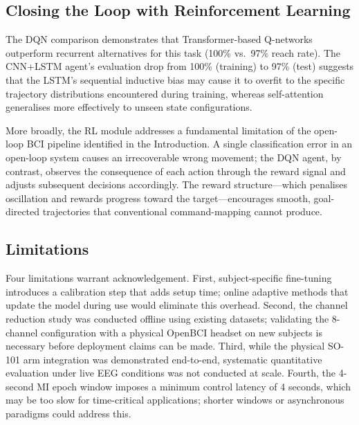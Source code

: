 \documentclass[12pt, a4paper]{article}
\begin{document}
\subsection{Closing the Loop with Reinforcement Learning}

The DQN comparison demonstrates that Transformer-based Q-networks outperform recurrent alternatives for this task (100\% vs.~97\% reach rate). The CNN+LSTM agent's evaluation drop from 100\% (training) to 97\% (test) suggests that the LSTM's sequential inductive bias may cause it to overfit to the specific trajectory distributions encountered during training, whereas self-attention generalises more effectively to unseen state configurations.

More broadly, the RL module addresses a fundamental limitation of the open-loop BCI pipeline identified in the Introduction. A single classification error in an open-loop system causes an irrecoverable wrong movement; the DQN agent, by contrast, observes the consequence of each action through the reward signal and adjusts subsequent decisions accordingly. The reward structure---which penalises oscillation and rewards progress toward the target---encourages smooth, goal-directed trajectories that conventional command-mapping cannot produce.

\subsection{Limitations}

Four limitations warrant acknowledgement. First, subject-specific fine-tuning introduces a calibration step that adds setup time; online adaptive methods that update the model during use would eliminate this overhead. Second, the channel reduction study was conducted offline using existing datasets; validating the 8-channel configuration with a physical OpenBCI headset on new subjects is necessary before deployment claims can be made. Third, while the physical SO-101 arm integration was demonstrated end-to-end, systematic quantitative evaluation under live EEG conditions was not conducted at scale. Fourth, the 4-second MI epoch window imposes a minimum control latency of 4 seconds, which may be too slow for time-critical applications; shorter windows or asynchronous paradigms could address this.
\end{document}
